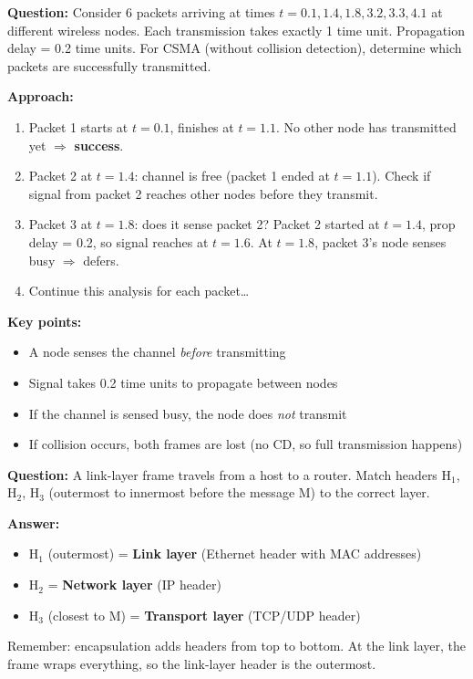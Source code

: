 \begin{exambox}
\textbf{Question:} Consider 6 packets arriving at times $t=0.1, 1.4, 1.8, 3.2, 3.3, 4.1$ at different wireless nodes. Each transmission takes exactly 1 time unit. Propagation delay = 0.2 time units. For CSMA (without collision detection), determine which packets are successfully transmitted.

\medskip
\textbf{Approach:}
\begin{enumerate}[noitemsep]
    \item Packet 1 starts at $t=0.1$, finishes at $t=1.1$. No other node has transmitted yet $\Rightarrow$ \textbf{success}.
    \item Packet 2 at $t=1.4$: channel is free (packet 1 ended at $t=1.1$). Check if signal from packet 2 reaches other nodes before they transmit.
    \item Packet 3 at $t=1.8$: does it sense packet 2? Packet 2 started at $t=1.4$, prop delay = 0.2, so signal reaches at $t=1.6$. At $t=1.8$, packet 3's node senses busy $\Rightarrow$ defers.
    \item Continue this analysis for each packet\ldots
\end{enumerate}

\textbf{Key points:}
\begin{itemize}[noitemsep]
    \item A node senses the channel \emph{before} transmitting
    \item Signal takes 0.2 time units to propagate between nodes
    \item If the channel is sensed busy, the node does \emph{not} transmit
    \item If collision occurs, both frames are lost (no CD, so full transmission happens)
\end{itemize}
\end{exambox}

\begin{exambox}
\textbf{Question:} A link-layer frame travels from a host to a router. Match headers H$_1$, H$_2$, H$_3$ (outermost to innermost before the message M) to the correct layer.

\textbf{Answer:}
\begin{itemize}[noitemsep]
    \item H$_1$ (outermost) = \textbf{Link layer} (Ethernet header with MAC addresses)
    \item H$_2$ = \textbf{Network layer} (IP header)
    \item H$_3$ (closest to M) = \textbf{Transport layer} (TCP/UDP header)
\end{itemize}

Remember: encapsulation adds headers from top to bottom. At the link layer, the frame wraps everything, so the link-layer header is the outermost.
\end{exambox}

